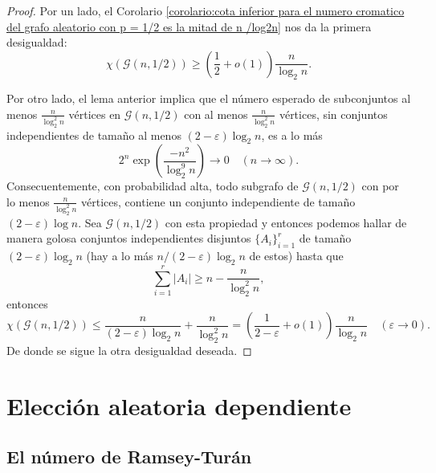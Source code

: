 \documentclass[12pt]{report}
\theoremstyle{plain}
\theoremstyle{definition}
\newcommand{\abs}[1]{\left \vert #1 \right \vert}
\begin{document}
\begin{proof}
Por un lado, el Corolario \ref{corolario:cota inferior para el numero cromatico del grafo aleatorio con p = 1/2 es la mitad de n /log2n} nos da la primera desigualdad:
\[
\chi (\mathcal G (n, 1/2)) \geq \left (\frac 1 2 + o(1) \right )
\frac{n}{\log_2 n}.
\]

Por otro lado, el lema anterior implica que el número esperado de subconjuntos al menos $\frac n {\log^2_2 n}$ vértices en $\mathcal G (n, 1/2)$ con al menos $\frac n {\log^2_2 n}$ vértices, sin conjuntos independientes de tamaño al menos $(2- \varepsilon) \log_2 n$, es a lo más
\[
2^n \exp \left (\frac{- n^2}{\log^9_2 n} \right ) \longrightarrow 0 \quad (n \to \infty).
\]
Consecuentemente, con probabilidad alta, todo subgrafo de $\mathcal G (n, 1/2)$ con por lo menos $\frac{n}{\log^2_2 n}$ vértices, contiene un conjunto independiente de tamaño $(2-\varepsilon) \log n$. Sea $\mathcal G (n, 1/2)$ con esta propiedad y entonces podemos hallar de manera golosa conjuntos independientes disjuntos $\{A_i\}_{i = 1}^r$ de tamaño $(2-\varepsilon) \log_2 n$ (hay a lo más $n / (2-\varepsilon) \log_2 n$ de estos) hasta que
\[
    \sum_{i = 1}^r \abs{A_i} \geq n - \frac{n}{\log^2_2 n},
\]
entonces
\[
    \chi (\mathcal G (n, 1/2)) \leq \frac{n}{(2-\varepsilon) \log_2 n} + \frac{n}{\log ^2_2 n} = \left (\frac{1}{2 - \varepsilon} + o(1) \right ) \frac{n}{\log_2 n} \quad ( \varepsilon \to 0).
\]
De donde se sigue la otra desigualdad deseada.

\end{proof}













\section{Elección aleatoria dependiente}

\subsection{El número de Ramsey-Turán}
\end{document}
